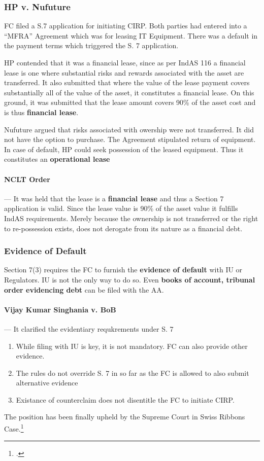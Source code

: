 \documentclass[12pt]{article}
\begin{document}
\subsubsection{HP v. Nufuture}
FC filed a S.7 application for initiating CIRP. Both parties had entered into a ``MFRA'' Agreement which was for leasing IT Equipment. There was a default in the payment terms which triggered the S. 7 application.

HP contended that it was a financial lease, since as per IndAS 116 a financial lease is one where substantial risks and rewards associated with the asset are transferred. It also submitted that where the value of the lease payment covers substantially all of the value of the asset, it constitutes a financial lease. On this ground, it was submitted that the lease amount covers 90\% of the asset cost and is thus \textbf{financial lease}.

Nufuture argued that risks associated with owership were not transferred. It did not have the option to purchase. The Agreement stipulated return of equipment. In case of default, HP could seek possession of the leased equipment. Thus it constitutes an \textbf{operational lease}

\paragraph{NCLT Order} --- It was held that the lease is a \textbf{financial lease} and thus a Section 7 application is valid. Since the lease value is 90\% of the asset value it fulfills IndAS requirements. Merely because the ownership is not transferred or the right to re-possession exists, does not derogate from its nature as a financial debt.

\subsubsection{Evidence of Default}

Section 7(3) requires the FC to furnish the \textbf{evidence of default} with IU or Regulators. IU is not the only way to do so. Even \textbf{books of account, tribunal order evidencing debt} can be filed with the AA.

\paragraph{Vijay Kumar Singhania v. BoB} --- It clarified the evidentiary requkrements under S. 7

\begin{enumerate}
  \item While filing with IU is key, it is not mandatory. FC can also provide other evidence. 
  \item The rules do not override S. 7 in so far as the FC is allowed to also submit alternative evidence
  \item Existance of counterclaim does not disentitle the FC to initiate CIRP. 
\end{enumerate}
The position has been finally upheld by the Supreme  Court in Swiss Ribbons Case.\footcite{justicer.fnarimanSwissRibbonsPvt2019}
\end{document}

